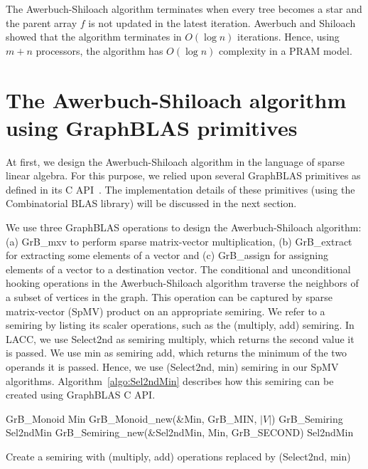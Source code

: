 The Awerbuch-Shiloach algorithm terminates when every tree becomes a star and the parent array $f$ is not updated in the latest iteration. 
Awerbuch and Shiloach showed that the algorithm terminates in $O(\log n)$ iterations. Hence, using $m+n$ processors, the algorithm has $O(\log n)$ complexity in a PRAM model. 




\section{The Awerbuch-Shiloach algorithm using GraphBLAS primitives}
\label{sec:LACC}
At first, we design the Awerbuch-Shiloach algorithm in the language of sparse linear algebra.
For this purpose, we relied upon several GraphBLAS primitives as defined in its C API~\cite{bulucc2017design}.
The implementation details of these primitives (using the Combinatorial BLAS library) will be discussed in the next section.

We use three GraphBLAS operations to design the Awerbuch-Shiloach algorithm: (a) GrB\_mxv to perform sparse matrix-vector multiplication, (b) GrB\_extract for extracting some elements of a vector and (c) GrB\_assign for assigning elements of a vector to a destination vector. 
The conditional and unconditional hooking operations in the Awerbuch-Shiloach algorithm traverse the neighbors of a subset of vertices  in the graph. This operation can be captured by sparse matrix-vector (SpMV) product on an appropriate semiring.  
We refer to a semiring by listing its scaler operations, such as the (multiply, add) semiring. 
In LACC, we use Select2nd as semiring multiply, which returns the second value it is passed. 
We use min as semiring add, which returns the minimum of the two operands it is passed.
Hence, we use (Select2nd, min) semiring in our SpMV algorithms. 
Algorithm~\ref{algo:Sel2ndMin} describes how this semiring can be created using GraphBLAS C API.

\begin{algorithm}[htbp]
\begin{algorithmic}[1]
\begin{small}
	\State GrB\_Monoid Min
	\State GrB\_Monoid\_new(\&Min, GrB\_MIN, $\lvert V \rvert$)
	\State GrB\_Semiring Sel2ndMin
	\State GrB\_Semiring\_new(\&Sel2ndMin, Min, GrB\_SECOND)
	\State \Return Sel2ndMin
\EndProcedure
\end{small}
\end{algorithmic}
\caption{Create a semiring with (multiply, add) operations replaced by (Select2nd, min)}
\label{algo:Sel2ndMin}
\end{algorithm}



